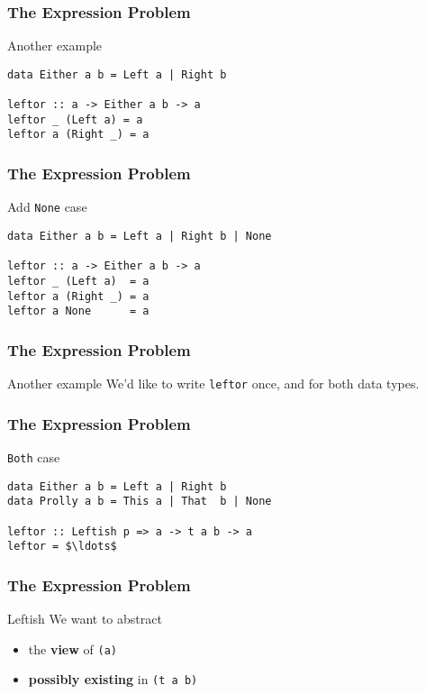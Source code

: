 \begin{frame}[fragile]
\frametitle{The Expression Problem}
\begin{block}{Another example}
\begin{lstlisting}[style=haskell,mathescape]
data Either a b = Left a | Right b

leftor :: a -> Either a b -> a
leftor _ (Left a) = a
leftor a (Right _) = a
\end{lstlisting}
\end{block}
\end{frame}

\begin{frame}[fragile]
\frametitle{The Expression Problem}
\begin{block}{Add \lstinline[style=haskell]{None} case}
\begin{lstlisting}[style=haskell,mathescape]
data Either a b = Left a | Right b | None

leftor :: a -> Either a b -> a
leftor _ (Left a)  = a
leftor a (Right _) = a
leftor a None      = a
\end{lstlisting}
\end{block}
\end{frame}

\begin{frame}[fragile]
\frametitle{The Expression Problem}
\begin{block}{Another example}
We'd like to write \lstinline[style=haskell]{leftor} once, and for both data types.
\end{block}
\end{frame}

\begin{frame}[fragile]
\frametitle{The Expression Problem}
\begin{block}{\lstinline[style=haskell]{Both} case}
\begin{lstlisting}[style=haskell,mathescape]
data Either a b = Left a | Right b
data Prolly a b = This a | That  b | None 

leftor :: Leftish p => a -> t a b -> a
leftor = $\ldots$
\end{lstlisting}
\end{block}
\end{frame}

\begin{frame}[fragile]
\frametitle{The Expression Problem}
\begin{block}{Leftish}
We want to abstract
\begin{itemize}
\item the \textbf{view} of \lstinline{(a)}
\item \textbf{possibly existing} in \lstinline{(t a b)}
\end{itemize}
\end{block}
\end{frame}

